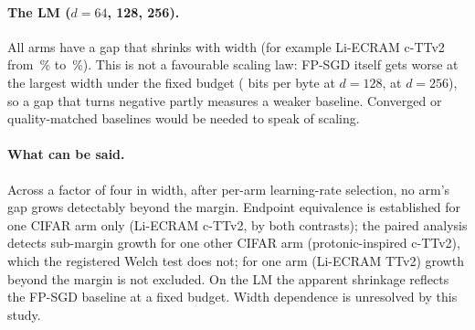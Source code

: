 \paragraph{The LM ($d=64$, 128, 256).} All \RVEFourLmNShrinks{} arms have a gap that shrinks with width (for example Li-ECRAM
c-TTv2 from \RVEFourLmEcramLiTangTwoZeroOneEightCttvTwoWSixFourGap\,\% to \RVEFourLmEcramLiTangTwoZeroOneEightCttvTwoWTwoFiveSixGap\,\%).
This is not a favourable scaling law: FP-SGD itself gets worse at the largest width under the fixed budget
(\RVEFourLmFpWOneTwoEight{} bits per byte at $d=128$, \RVEFourLmFpWTwoFiveSix{} at $d=256$), so a gap that turns negative partly
measures a weaker baseline. Converged or quality-matched baselines would be needed to speak of scaling.

\paragraph{What can be said.} Across a factor of four in width, after per-arm learning-rate selection, no arm's gap grows
detectably beyond the margin. Endpoint equivalence is established for one CIFAR arm only (Li-ECRAM c-TTv2, by both contrasts);
the paired analysis detects sub-margin growth for one other CIFAR arm (protonic-inspired c-TTv2), which the registered Welch test
does not; for one arm (Li-ECRAM TTv2) growth beyond the margin is not excluded. On the LM the apparent shrinkage reflects the FP-SGD
baseline at a fixed budget. Width dependence is unresolved by this study.


